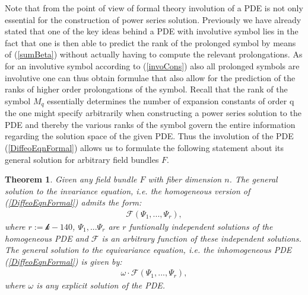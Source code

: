 \documentclass[a4paper,12pt, DIV=14, BCOR=5mm, twoside, headsepline, numbers=noenddot]{scrbook}
\newtheorem{theorem}{Theorem}[section]
\begin{document}
Note that from the point of view of formal theory involution of a PDE is not only essential for the construction of power series solution. Previously we have already stated that one of the key ideas behind a PDE with involutive symbol lies in the fact that one is then able to predict the rank of the prolonged symbol by means of (\ref{sumBeta}) without actually having to compute the relevant prolongations. As for an involutive symbol according to (\ref{invoCons}) also all prolonged symbols are involutive one can thus obtain formulae that also allow for the prediction of the ranks of higher order prolongations of the symbol. Recall that the rank of the symbol $M_q$ essentially determines the number of expansion constants of order q the one might specify arbitrarily when constructing a power series solution to the PDE  and thereby the various ranks of the symbol govern the entire information regarding the solution space of the given PDE.
Thus the involution of the PDE (\ref{DiffeoEqnFormal}) allows us to formulate the following statement about its general solution for arbitrary field bundles $F$.
\begin{theorem}\label{GeneralSol}
Given any field bundle $F$ with fiber dimension $n$. The general solution to the invariance equation, i.e. the homogeneous version of (\ref{DiffeoEqnFormal}) admits the form:
\begin{align}
    \mathcal{F} \left (\Psi_1,...,\Psi_r \right ),
\end{align}
where $r:=\mathcal{k}-140$, $\Psi_1,...\Psi_r$ are $r$ funtionally independent solutions of the homogeneous PDE and $\mathcal{F}$ is an arbitrary function of these independent solutions. The general solution to the equivariance equation, i.e. the inhomogeneous PDE (\ref{DiffeoEqnFormal}) is given by:
\begin{align}
    \omega \cdot \mathcal{F} \left (\Psi_1,...,\Psi_r \right ),
\end{align}
where $\omega$ is any explicit solution of the PDE. 
\end{theorem}
\end{document}
